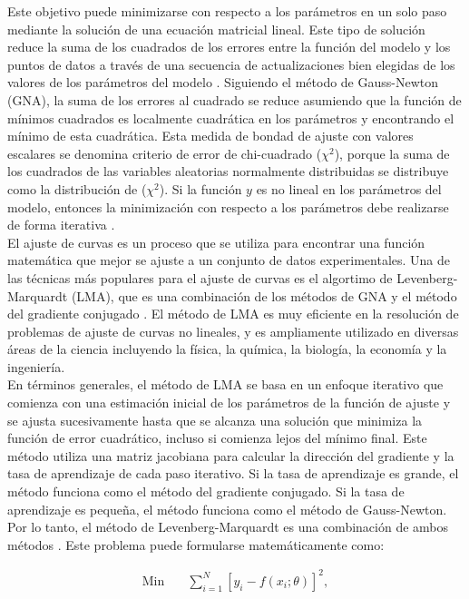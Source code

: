 Este objetivo puede minimizarse con respecto a los parámetros en un solo paso mediante la solución de una ecuación matricial lineal. Este tipo de solución reduce la suma de los cuadrados de los errores entre la función del modelo y los puntos de datos a través de una secuencia de actualizaciones bien elegidas de los valores de los parámetros del modelo \cite{levenberduke}. Siguiendo el método de Gauss-Newton (GNA), la suma de los errores al cuadrado se reduce asumiendo que la función de mínimos cuadrados es localmente cuadrática en los parámetros y encontrando el mínimo de esta cuadrática. Esta medida de bondad de ajuste con valores escalares se denomina criterio de error de chi-cuadrado ($\chi^{2}$), porque la suma de los cuadrados de las variables aleatorias normalmente distribuidas se distribuye como la distribución de ($\chi^{2}$). Si la función $y$ es no lineal en los parámetros del modelo, entonces la minimización con respecto a los parámetros debe realizarse de forma iterativa \cite{levenberduke}. \\

El ajuste de curvas es un proceso que se utiliza para encontrar una función matemática que mejor se ajuste a un conjunto de datos experimentales. Una de las técnicas más populares para el ajuste de curvas es el algortimo de Levenberg-Marquardt (LMA), que es una combinación de los métodos de GNA y el método del gradiente conjugado \cite{levenberduke}. El método de LMA es muy eficiente en la resolución de problemas de ajuste de curvas no lineales, y es ampliamente utilizado en diversas áreas de la ciencia incluyendo la física, la química, la biología, la economía y la ingeniería.\\


En términos generales, el método de LMA se basa en un enfoque iterativo que comienza con una estimación inicial de los parámetros de la función de ajuste y se ajusta sucesivamente hasta que se alcanza una solución que minimiza la función de error cuadrático, incluso si comienza lejos del mínimo final. Este método utiliza una matriz jacobiana para calcular la dirección del gradiente y la tasa de aprendizaje de cada paso iterativo. Si la tasa de aprendizaje es grande, el método funciona como el método del gradiente conjugado. Si la tasa de aprendizaje es pequeña, el método funciona como el método de Gauss-Newton. Por lo tanto, el método de Levenberg-Marquardt es una combinación de ambos métodos \cite{levenberduke}. Este problema puede formularse matemáticamente como:

\begin{align}
\text{Min} \quad & \sum_{i=1}^{N} [y_i - f(x_i; \theta)]^2,
\end{align}

